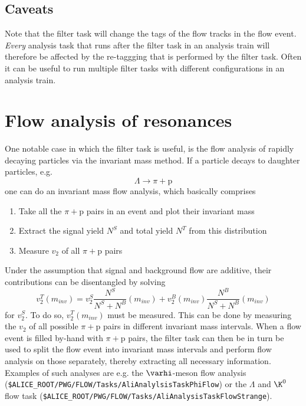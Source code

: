 \documentclass[a4paper]{book}
\numberwithin{equation}{subsection}
\begin{document}
\subsection{Caveats}
Note that the filter task will change the tags of the flow tracks in the flow event. \emph{Every} analysis task that runs after the filter task in an analysis train will therefore be affected by the re-taggging that is performed by the filter task. Often it can be useful to run multiple filter tasks with different configurations in an analysis train. 

\section{Flow analysis of resonances}
One notable case in which the filter task is useful, is the flow analysis of rapidly decaying particles via the invariant mass method. If a particle decays to daughter particles, e.g.
\begin{equation}
\Lambda \longrightarrow \pi + \mbox{p}
\end{equation}
one can do an invariant mass flow analysis, which basically comprises
\begin{enumerate}
\item Take all the $\pi + \mbox{p}$ pairs in an event and plot their invariant mass
\item Extract the signal yield \alert{$N^S$} and total yield \alert{$N^T$} from this distribution
\item Measure $v_2$ of all $\pi + \mbox{p}$ pairs
\end{enumerate}
Under the assumption that signal and background flow are additive, their contributions can be disentangled by solving
\begin{equation}
v_2^{T}(m_{inv})  = v_2^{S} \frac{N^{S} }{N^{S} + N^{B}}(m_{inv})  + v_2^{B}(m_{inv}) \frac{ N^{B}}{N^{S} + N^{B}}(m_{inv})
\end{equation}
for $v_2^{S}$. To do so, $v_2^{T}(m_{inv})$ must be measured. This can be done by measuring the $v_2$ of all possible $\pi + \mbox{p}$ pairs in different invariant mass intervals. When a flow event is filled by-hand with $\pi + \mbox{p}$ pairs, the filter task can then be in turn be used to split the flow event into invariant mass intervals and perform flow analysis on those separately, thereby extracting all necessary information. Examples of such analyses are e.g. the $\varhi$-meson flow analysis (\texttt{\$ALICE\_ROOT/PWG/FLOW/Tasks/AliAnalylsisTaskPhiFlow}) or the $\Lambda$ and $\K^0$ flow task (\texttt{\$ALICE\_ROOT/PWG/FLOW/Tasks/AliAnalysisTaskFlowStrange}).
\end{document}

